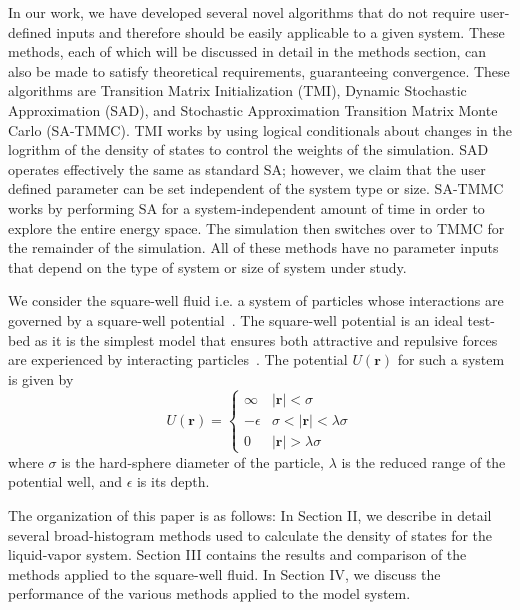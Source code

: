 \documentclass[letterpaper,twocolumn,amsmath,amssymb,pre,aps,10pt]{revtex4-1}
\begin{document}
In our work, we have developed several novel algorithms that do not
require user-defined inputs and therefore should be easily applicable
to a given system.  These methods, each of which will be discussed in
detail in the methods section, can also be made to satisfy theoretical
requirements, guaranteeing convergence. These algorithms are Transition
Matrix Initialization (TMI), Dynamic Stochastic Approximation (SAD),
and Stochastic Approximation Transition Matrix Monte Carlo (SA-TMMC).
TMI works by using logical conditionals about changes in the logrithm
of the density of states to control the weights of the simulation.  SAD
operates effectively the same as standard SA; however, we claim that
the user defined parameter can be set independent of the system type or
size.  SA-TMMC works by performing SA for a system-independent amount
of time in order to explore the entire energy space.  The simulation
then switches over to TMMC for the remainder of the simulation.  All of
these methods have no parameter inputs that depend on the type of
system or size of system under study.

We consider the square-well fluid i.e. a system of particles whose
interactions are governed by a square-well
potential~\cite{singh2003surface, barker2004perturbationSW}.  The
square-well potential is an ideal test-bed as it is the simplest model
that ensures both attractive and repulsive forces are experienced by
interacting particles~\cite{barker1967-SW-perturbation, vega1992phase}.
The potential $U(\textbf{r})$ for such a system is given by
\begin{equation}
 U(\textbf{r})=\begin{cases} \infty &
 \lvert\textbf{r}\rvert< \sigma\\-\epsilon &
 \sigma<\lvert\textbf{r}\rvert<\lambda\sigma\\0 &
 \lvert\textbf{r}\rvert > \lambda\sigma\end{cases}
\end{equation}
where $\sigma$ is the hard-sphere diameter of the particle, $\lambda$ is the
reduced range of the potential well, and $\epsilon$ is its depth.

The organization of this paper is as follows: In Section II, we
describe in detail several broad-histogram methods used to calculate
the density of states for the liquid-vapor system.  Section III
contains the results and comparison of the methods applied to the
square-well fluid.  In Section IV, we discuss the performance of the
various methods applied to the model system.
\end{document}
